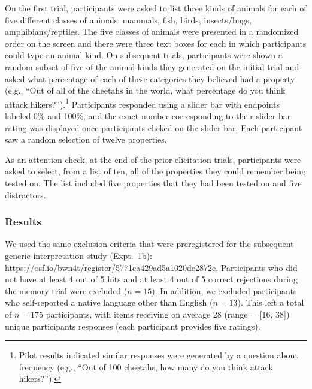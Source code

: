 \documentclass[floatsintext,doc]{apa6}
\let\rmarkdownfootnote\footnote%
\def\footnote{\protect\rmarkdownfootnote}
\begin{document}
On the first trial, participants were asked to list three kinds of animals for each of five different classes of animals: mammals, fish, birds, insects/bugs, amphibians/reptiles.
The five classes of animals were presented in a randomized order on the screen and there were three text boxes for each in which participants could type an animal kind.
On subsequent trials, participants were shown a random subset of five of the animal kinds they generated on the initial trial and asked what percentage of each of these categories they believed had a property (e.g., \enquote{Out of all of the cheetahs in the world, what percentage do you think attack hikers?}).\footnote{Pilot results indicated similar responses were generated by a question about frequency (e.g., \enquote{Out of 100 cheetahs, how many do you think attack hikers?}).} 
Participants responded using a slider bar with endpoints labeled 0\% and 100\%, and the exact number corresponding to their slider bar rating was displayed once participants clicked on the slider bar.
Each participant saw a random selection of twelve properties.

As an attention check, at the end of the prior elicitation trials, participants were asked to select, from a list of ten, all of the properties they could remember being tested on.
The list included five properties that they had been tested on and five distractors.

\hypertarget{results}{%
\subsubsection{Results}\label{results}}

We used the same exclusion criteria that were preregistered for the subsequent generic interpretation study (Expt.~1b): \url{https://osf.io/bwn4t/register/5771ca429ad5a1020de2872e}.
Participants who did not have at least 4 out of 5 hits and at least 4 out of 5 correct rejections during the memory trial were excluded (\(n = 15\)).
In addition, we excluded participants who self-reported a native language other than English (\(n = 13\)).
This left a total of \(n = 175\) participants, with items receiving on average 28 (range = {[}16, 38{]}) unique participants responses (each participant provides five ratings).
\end{document}
